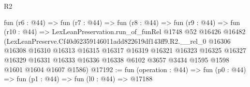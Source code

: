 \begin{lexlean}{R2}
\begin{coremodule}
  fun (r6 : @44) =>
  fun (r7 : @44) =>
  fun (r8 : @44) =>
  fun (r9 : @44) =>
  fun (r10 : @44) =>
  LexLeanPreservation.run_of_funRel
    @1748
    @52
    @16426
    @16482
    (LexLeanPreserve.Cf40d62359146011add822619df143ff9.R2.__rel_0
      @16306
      @16308
      @16310
      @16313
      @16315
      @16317
      @16319
      @16321
      @16323
      @16325
      @16327
      @16329
      @16331
      @16333
      @16336
      @16338
      @6102
      @3657
      @3434
      @1595
      @1598
      @1601
      @1604
      @1607
      @1586)
@17192 := fun (operation : @44) => fun (p0 : @44) => fun (p1 : @44) => fun (l0 : @44) => @17188
\end{coremodule}
\end{lexlean}

